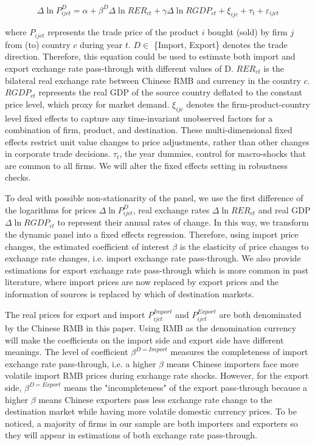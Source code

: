 \documentclass[12pt]{article}
\begin{document}
\begin{equation}
	\Delta \ln P^{D}_{i j c t}=\alpha+\beta^D \Delta \ln R E R_{c t}+\gamma \Delta \ln R G D P_{c t}+\xi_{i j c}+\tau_{t}+\varepsilon_{i j c t}
	\label{eq.baseline}
\end{equation}

where $P_{ijct}$ represents the trade price of the product $i$ bought (sold) by firm $j$ from (to) country $c$ during year $t$.  $D \in$ \{Import, Export\} denotes the trade direction. Therefore, this equation could be used to estimate both import and export exchange rate pass-through with different values of D. $R E R_{c t}$ is the bilateral real exchange rate between Chinese RMB and currency in the country $c$. $RGDP_{ct}$ represents the real GDP of the source country deflated to the constant price level, which proxy for market demand. $\xi_{ijc}$ denotes the firm-product-country level fixed effects to capture any time-invariant unobserved factors for a combination of firm, product, and destination. These multi-dimensional fixed effects restrict unit value changes to price adjustments, rather than other changes in corporate trade decisions. $\tau_t$, the year dummies, control for macro-shocks that are common to all firms. We will alter the fixed effects setting in robustness checks.

To deal with possible non-stationarity of the panel, we use the first difference of the logarithms for prices $\Delta \ln P^{D}_{i j c t}$, real exchange rates $\Delta \ln R E R_{c t}$ and real GDP $\Delta \ln R G D P_{c t}$ to represent their annual rates of change. In this way, we transform the dynamic panel into a fixed effects regression. Therefore, using import price changes, the estimated coefficient of interest $\beta$ is the elasticity of price changes to exchange rate changes, i.e. import exchange rate pass-through. We also provide estimations for export exchange rate pass-through which is more common in past literature, where import prices are now replaced by export prices and the information of sources is replaced by which of destination markets. 

The real prices for export and import $P^{Import}_{i j c t}$ and $P^{Export}_{i j c t}$ are both denominated by the Chinese RMB in this paper. Using RMB as the denomination currency will make the coefficients on the import side and export side have different meanings. The level of coefficient $\beta^{D=Import}$ measures the completeness of import exchange rate pass-through, i.e. a higher $\beta$ means Chinese importers face more volatile import RMB prices during exchange rate shocks. However, for the export side,  $\beta^{D=Export}$ means the "incompleteness" of the export pass-through because a higher $\beta$ means Chinese exporters pass less exchange rate change to the destination market while having more volatile domestic currency prices. To be noticed, a majority of firms in our sample are both importers and exporters so they will appear in estimations of both exchange rate pass-through.
\end{document}
